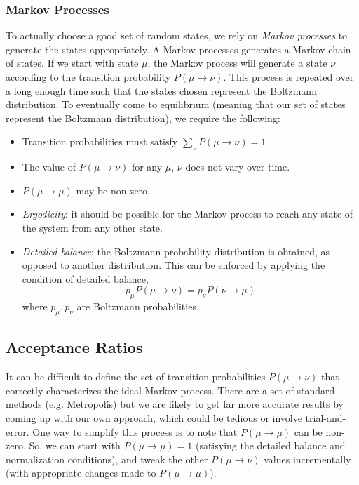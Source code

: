\documentclass{article}
\begin{document}
\subsubsection{Markov Processes}
To actually choose a good set of random states, we rely on \emph{Markov processes} to generate
the states appropriately. A Markov processes generates a Markov chain of states. If we start
with state $\mu$, the Markov process will generate a state $\nu$ according to the transition
probability $P(\mu \rightarrow \nu)$. This process is repeated over a long enough time such that
the states chosen represent the Boltzmann distribution. To eventually come to equilibrium (meaning
that our set of states represent the Boltzmann distribution), we require the following:
\begin{itemize}
\item Transition probabilities must satisfy $\sum_{\nu}P(\mu \rightarrow \nu) = 1$
\item The value of $P(\mu \rightarrow \nu)$ for any $\mu$, $\nu$ does not vary over time.
\item $P(\mu \rightarrow \mu)$ may be non-zero.
\item \emph{Ergodicity}: it should be possible for the Markov process to reach any state of the system from
any other state.
\item \emph{Detailed balance}: the Boltzmann probability distribution is obtained, as opposed to another distribution. This can be
enforced by applying the condition of detailed balance,
$$p_{\mu}P(\mu \rightarrow \nu) = p_{\nu}P(\nu \rightarrow \mu)$$
where $p_{\mu}, p_{\nu}$ are Boltzmann probabilities.
\end{itemize}

\subsection{Acceptance Ratios}
It can be difficult to define the set of transition probabilities $P(\mu \rightarrow \nu)$ that
correctly characterizes the ideal Markov process. There are a set of standard methods (e.g. Metropolis)
but we are likely to get far more accurate results by coming up with our own approach, which could be tedious
or involve trial-and-error. One way to simplify this process is to note that $P(\mu \rightarrow \mu)$ can be
non-zero. So, we can start with $P(\mu \rightarrow \mu) = 1$ (satisying the detailed balance and normalization
conditions), and tweak the other $P(\mu \rightarrow \nu)$ values incrementally (with appropriate changes made to
$P(\mu \rightarrow \mu)$).
\end{document}
